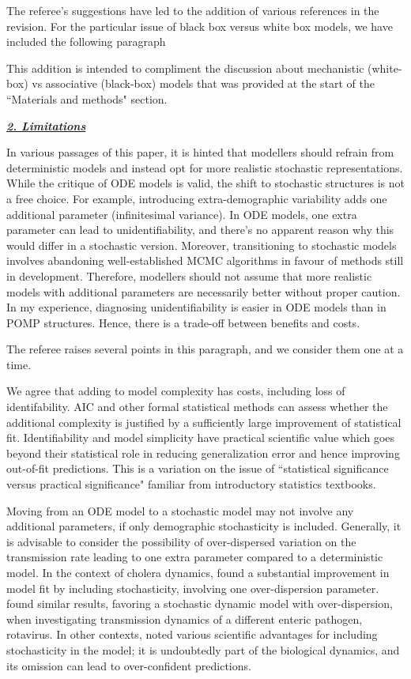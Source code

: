 \documentclass[11pt]{article}
\newcommand\report[1]{{\color{mygreen} \vspace{1mm}\hspace{0.25in}\parbox{6in}{\em #1}}}
\newcommand\article[1]{{\color{blue} \vspace{1mm}\hspace{0.25in}\parbox{6in}{\em #1}}}
\begin{document}
The referee's suggestions have led to the addition of various references in the revision.
For the particular issue of black box versus white box models, we have included the following paragraph

\article{\editMechModels}

This addition is intended to compliment the discussion about mechanistic (white-box) vs associative (black-box) models that was provided at the start of the ``Materials and methods" section. 

\report{
\textbf{\underline{2. Limitations}}

In various passages of this paper, it is hinted that modellers should refrain from deterministic models and instead opt for more realistic stochastic representations. While the critique of ODE models is valid, the shift to stochastic structures is not a free choice. For example, introducing extra-demographic variability adds one additional parameter (infinitesimal variance). In ODE models, one extra parameter can lead to unidentifiability, and there's no apparent reason why this would differ in a stochastic version. Moreover, transitioning to stochastic models involves abandoning well-established MCMC algorithms in favour of methods still in development. Therefore, modellers should not assume that more realistic models with additional parameters are necessarily better without proper caution. In my experience, diagnosing unidentifiability is easier in ODE models than in POMP structures. Hence, there is a trade-off between benefits and costs.
}

The referee raises several points in this paragraph, and we consider them one at a time.

We agree that adding to model complexity has costs, including loss of identifability.
AIC and other formal statistical methods can assess whether the additional complexity is justified by a sufficiently large improvement of statistical fit. Identifiability and model simplicity have practical scientific value which goes beyond their statistical role in reducing generalization error and hence improving out-of-fit predictions. This is a variation on the issue of ``statistical significance versus practical significance" familiar from introductory statistics textbooks.

Moving from an ODE model to a stochastic model may not involve any additional parameters, if only demographic stochasticity is included.
Generally, it is advisable to consider the possibility of over-dispersed variation on the transmission rate \cite{breto09,he10} leading to one extra parameter compared to a deterministic model.
In the context of cholera dynamics, \cite{lemaitre19} found a substantial improvement in model fit by including stochasticity, involving one over-dispersion parameter.
\cite{stocks20} found similar results, favoring a stochastic dynamic model with over-dispersion, when investigating transmission dynamics of a different enteric pathogen, rotavirus.
In other contexts, \cite{king15} noted various scientific advantages for including stochasticity in the model; it is undoubtedly part of the biological dynamics, and its omission can lead to over-confident predictions.
\end{document}

